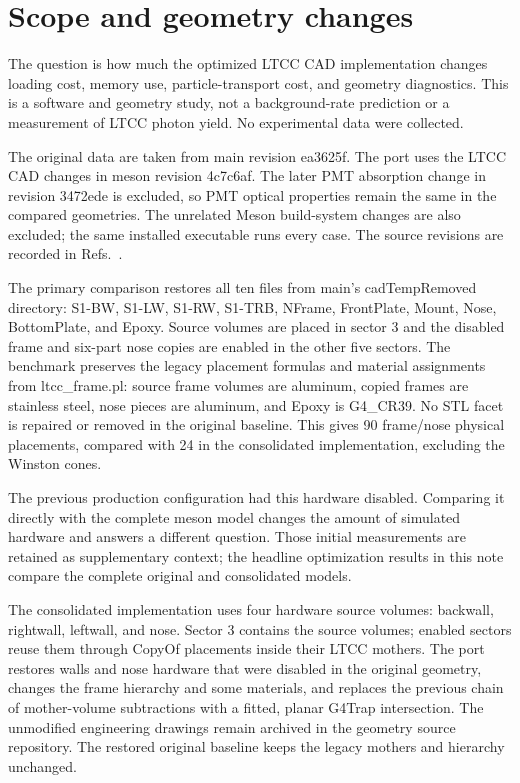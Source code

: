 \FloatBarrier

\section{Scope and geometry changes}

The question is how much the optimized LTCC CAD implementation changes loading cost, memory use,
particle-transport cost, and geometry diagnostics. This is a software and geometry study, not a background-rate
prediction or a measurement of LTCC photon yield. No experimental data were collected.

The original data are taken from main revision ea3625f. The port uses the LTCC CAD changes in meson revision
4c7c6af. The later PMT absorption change in revision 3472ede is excluded, so PMT optical properties remain the
same in the compared geometries. The unrelated Meson build-system changes are also excluded; the same installed
executable runs every case. The source revisions are recorded in Refs.~\cite{baseline,optimized}.

The primary comparison restores all ten files from main's cadTempRemoved directory: S1-BW, S1-LW, S1-RW,
S1-TRB, NFrame, FrontPlate, Mount, Nose, BottomPlate, and Epoxy. Source volumes are placed in sector 3 and the
disabled frame and six-part nose copies are enabled in the other five sectors. The benchmark preserves the
legacy placement formulas and material assignments from ltcc\_frame.pl: source frame volumes are aluminum,
copied frames are stainless steel, nose pieces are aluminum, and Epoxy is G4\_CR39. No STL facet is repaired or
removed in the original baseline. This gives 90 frame/nose physical placements, compared with 24 in the
consolidated implementation, excluding the Winston cones.

The previous production configuration had this hardware disabled. Comparing it directly with the complete meson
model changes the amount of simulated hardware and answers a different question. Those initial measurements are
retained as supplementary context; the headline optimization results in this note compare the complete original
and consolidated models.

The consolidated implementation uses four hardware source volumes: backwall, rightwall, leftwall, and nose.
Sector 3 contains the source volumes; enabled sectors reuse them through CopyOf placements inside their LTCC
mothers. The port restores walls and nose hardware that were disabled in the original geometry, changes the
frame hierarchy and some materials, and replaces the previous chain of mother-volume subtractions with a
fitted, planar G4Trap intersection. The unmodified engineering drawings remain archived in the geometry source
repository. The restored original baseline keeps the legacy mothers and hierarchy unchanged.

